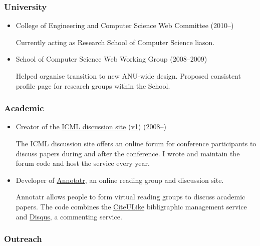 \documentclass{article}
\begin{document}
\hypertarget{university}{}\subsubsection*{{University}}\label{university}

\begin{itemize}%
\item College of Engineering and Computer Science Web Committee (2010--{})

Currently acting as Research School of Computer Science liason.


\item School of Computer Science Web Working Group (2008--{}2009)

Helped organise transition to new ANU-wide design. Proposed consistent profile page for research groups within the School.



\end{itemize}
\hypertarget{academic}{}\subsubsection*{{Academic}}\label{academic}

\begin{itemize}%
\item Creator of the \href{http://mldiscuss.appspot.com}{ICML discussion site} (\href{http://conflate.net/icml/}{v1}) (2008--{})

The ICML discussion site offers an online forum for conference participants to discuss papers during and after the conference. I wrote and maintain the forum code and host the service every year.


\item Developer of \href{http://annotatr.appspot.com/}{Annotatr}, an online reading group and discussion site.

Annotatr allows people to form virtual reading groups to discuss academic papers. The code combines the \href{http://citeulike.org}{CiteULike} bibligraphic management service and \href{http://disqus.com}{Disqus}, a commenting service.



\end{itemize}
\hypertarget{outreach}{}\subsubsection*{{Outreach}}\label{outreach}
\end{document}
